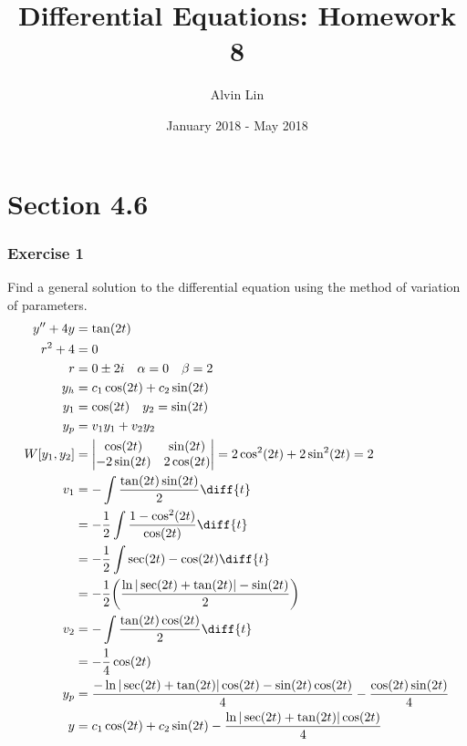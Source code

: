 \documentclass{math}
\title{Differential Equations: Homework 8}
\author{Alvin Lin}
\date{January 2018 - May 2018}
\begin{document}
\maketitle
\clearpage

\section*{Section 4.6}

\subsubsection*{Exercise 1}
Find a general solution to the differential equation using the method of
variation of parameters.
\begin{align*}
  y''+4y &= \tan(2t) \\
  r^2+4 &= 0 \\
  r &= 0\pm2i \quad \alpha = 0 \quad \beta = 2 \\
  y_h &= c_1\cos(2t)+c_2\sin(2t) \\
  y_1 &= \cos(2t) \quad y_2 = \sin(2t) \\
  y_p &= v_1y_1+v_2y_2 \\
  W[y_1,y_2] &= \begin{vmatrix}
    \cos(2t) & \sin(2t) \\
    -2\sin(2t) & 2\cos(2t)
  \end{vmatrix} = 2\cos^2(2t)+2\sin^2(2t) = 2 \\
  v_1 &= -\int\frac{\tan(2t)\sin(2t)}{2}\diff{t} \\
  &= -\frac{1}{2}\int\frac{1-\cos^2(2t)}{\cos(2t)}\diff{t} \\
  &= -\frac{1}{2}\int\sec(2t)-\cos(2t)\diff{t} \\
  &= -\frac{1}{2}\bigg(\frac{\ln|\sec(2t)+\tan(2t)|-\sin(2t)}{2}\bigg) \\
  v_2 &= -\int\frac{\tan(2t)\cos(2t)}{2}\diff{t} \\
  &= -\frac{1}{4}\cos(2t) \\
  y_p &= \frac{-\ln|\sec(2t)+\tan(2t)|\cos(2t)-\sin(2t)\cos(2t)}{4}-
    \frac{\cos(2t)\sin(2t)}{4} \\
  y &= c_1\cos(2t)+c_2\sin(2t)-\frac{\ln|\sec(2t)+\tan(2t)|\cos(2t)}{4}
\end{align*}
\end{document}
